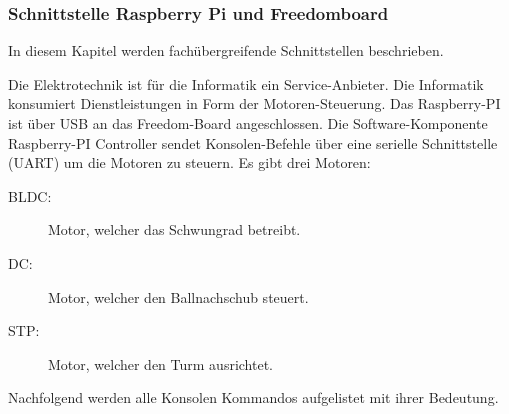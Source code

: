\subsubsection{Schnittstelle Raspberry Pi und Freedomboard}
In diesem Kapitel werden fachübergreifende Schnittstellen beschrieben.

\label{sec:schnittstelle-raspi-freedom}
Die Elektrotechnik ist für die Informatik ein Service-Anbieter. Die
Informatik konsumiert Dienstleistungen in Form der Motoren-Steuerung.
Das Raspberry-PI ist über USB an das Freedom-Board angeschlossen. Die
Software-Komponente Raspberry-PI Controller sendet Konsolen-Befehle
über eine serielle Schnittstelle (UART) um die Motoren zu steuern. Es
gibt drei Motoren:

\begin{description}
	\item[BLDC:] Motor, welcher das Schwungrad betreibt.
	\item[DC:] Motor, welcher den Ballnachschub steuert.
	\item[STP:] Motor, welcher den Turm ausrichtet.
\end{description}

\noindent
Nachfolgend werden alle Konsolen Kommandos aufgelistet mit ihrer
Bedeutung. \\

